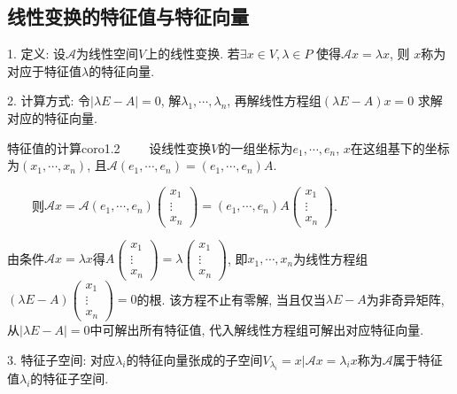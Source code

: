   
\subsection{线性变换的特征值与特征向量}

1. 定义: 设$\mathscr{A}$为线性空间$V$上的线性变换. 若$\exists x \in V, \lambda \in P$ 使得$\mathscr{A} x=\lambda x$, 则
$x$称为对应于特征值$\lambda$的特征向量.

2. 计算方式: 令$|\lambda E-A|=0$, 解$\lambda_1,\cdots,\lambda_n$, 再解线性方程组$(\lambda E-A)x=0$ 求解对应的特征向量.
\begin{coro}{特征值的计算}{coro1.2}
    ~~~~设线性变换$V$的一组坐标为$e_1,\cdots,e_n$, $x$在这组基下的坐标为$(x_1,\cdots,x_n)$, 且$\mathscr{A}(e_1,\cdots,e_n)=(e_1,\cdots,e_n)A$.

    ~~~~则$\mathscr{A}x=\mathscr{A}(e_1,\cdots,e_n)\begin{pmatrix}
        x_1\\
        \vdots\\
        x_n
    \end{pmatrix}=(e_1,\cdots,e_n)A\begin{pmatrix}
        x_1\\
        \vdots\\
        x_n
    \end{pmatrix}$.

    由条件$\mathscr{A}x=\lambda x$得$A\begin{pmatrix}
        x_1\\
        \vdots\\
        x_n
    \end{pmatrix}=\lambda\begin{pmatrix}
        x_1\\
        \vdots\\
        x_n
    \end{pmatrix}$, 即$x_1,\cdots,x_n$为线性方程组$(\lambda E-A)\begin{pmatrix}
        x_1\\
        \vdots\\
        x_n
    \end{pmatrix}=0$的根. 该方程不止有零解, 当且仅当$\lambda E-A$为非奇异矩阵, 从$|\lambda E-A|=0$中可解出所有特征值, 代入解线性方程组可解出对应特征向量.
\end{coro}

    3. 特征子空间: 对应$\lambda_i$的特征向量张成的子空间$V_{\lambda_i}={x|\mathscr{A}x=\lambda_i x}$称为$\mathscr{A}$属于特征值$\lambda_i$的特征子空间.

